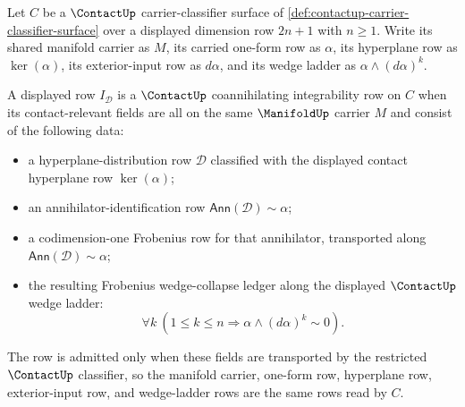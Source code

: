 \begin{definition}
\label{def:contactup-coannihilating-integrability-row}
Let $C$ be a $\ContactUp$ carrier-classifier surface of \autoref{def:contactup-carrier-classifier-surface} over a displayed dimension row $2n+1$ with $n\ge1$. Write its shared manifold carrier as $M$, its carried one-form row as $\alpha$, its hyperplane row as $\ker(\alpha)$, its exterior-input row as $d\alpha$, and its wedge ladder as $\alpha\wedge(d\alpha)^k$.

A displayed row $I_{\mathcal{D}}$ is a $\ContactUp$ coannihilating integrability row on $C$ when its contact-relevant fields are all on the same $\ManifoldUp$ carrier $M$ and consist of the following data:
\begin{itemize}
  \item a hyperplane-distribution row $\mathcal{D}$ classified with the displayed contact hyperplane row $\ker(\alpha)$;
  \item an annihilator-identification row $\mathsf{Ann}(\mathcal{D})\sim\alpha$;
  \item a codimension-one Frobenius row for that annihilator, transported along $\mathsf{Ann}(\mathcal{D})\sim\alpha$;
  \item the resulting Frobenius wedge-collapse ledger along the displayed $\ContactUp$ wedge ladder:
  $$
  \forall k\ (1\le k\le n\Rightarrow \alpha\wedge(d\alpha)^k\sim0).
  $$
\end{itemize}
The row is admitted only when these fields are transported by the restricted $\ContactUp$ classifier, so the manifold carrier, one-form row, hyperplane row, exterior-input row, and wedge-ladder rows are the same rows read by $C$.
\end{definition}

